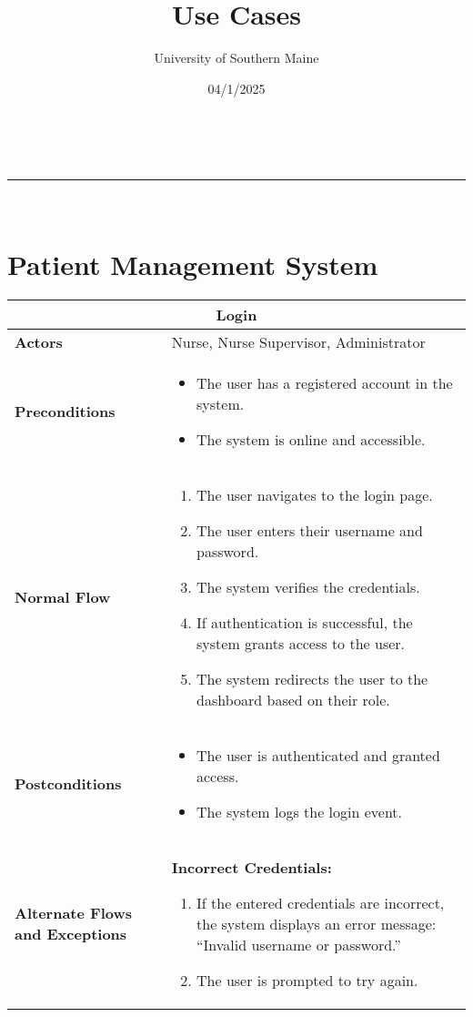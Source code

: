 \documentclass{article}
\makeatletter
\newcommand{\linia}{\rule{\linewidth}{0.5pt}}
\renewcommand{\maketitle}{
\begin{center}
\vspace{2ex}
{\huge \textsc{\@title}}
\vspace{1ex}
\\
\linia\\
\@author \hfill \@date
\vspace{4ex}
\end{center}
}
\makeatother
\begin{document}
\title{Use Cases}

\author{University of Southern Maine}

\date{04/1/2025}

\maketitle
\section{Patient Management System}
\renewcommand{\arraystretch}{1.3} %

\begin{longtable}{| p{5cm} | p{10cm} |}
    \hline
    \multicolumn{2}{|c|}{\textbf{Login}} \\
    \hline
    \textbf{Actors} & Nurse, Nurse Supervisor, Administrator \\
    \hline
    \textbf{Preconditions} & 
    \begin{itemize}
        \item The user has a registered account in the system.
        \item The system is online and accessible.
    \end{itemize} \\
    \hline
    \textbf{Normal Flow} & 
    \begin{enumerate}
        \item The user navigates to the login page.
        \item The user enters their username and password.
        \item The system verifies the credentials.
        \item If authentication is successful, the system grants access to the user.
        \item The system redirects the user to the dashboard based on their role.
    \end{enumerate} \\
    \hline
    \textbf{Postconditions} & 
    \begin{itemize}
        \item The user is authenticated and granted access.
        \item The system logs the login event.
    \end{itemize} \\
    \hline
    \textbf{Alternate Flows and Exceptions} & 
    \textbf{Incorrect Credentials:}  
    \begin{enumerate}
        \item If the entered credentials are incorrect, the system displays an error message: “Invalid username or password.”
        \item The user is prompted to try again.
    \end{enumerate}\\
    

\end{longtable}
\end{document}
